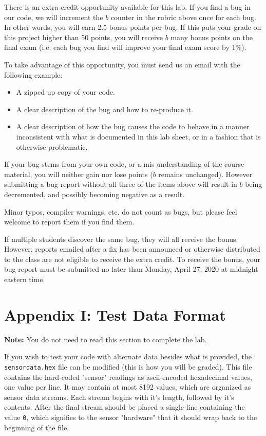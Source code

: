 \documentclass{article}
\begin{document}
There is an extra credit opportunity available for this lab. If you find a bug
in our code, we will increment the $b$ counter in the rubric above once for
each bug. In other words, you will earn 2.5 bonus points per bug. If this puts
your grade on this project higher than 50 points, you will receive $b$ many
bonus points on the final exam (i.e. each bug you find will improve your final
exam score by 1\%).

To take advantage of this opportunity, you must send us an email with the
following example:

\begin{itemize}

	\item A zipped up copy of your code.

	\item A clear description of the bug and how to re-produce it.

	\item A clear description of how the bug causes the code to behave in a
		manner inconsistent with what is documented in this lab sheet,
		or in a fashion that is otherwise problematic.

\end{itemize}

If your bug stems from your own code, or a mis-understanding of the course
material, you will neither gain nor lose points ($b$ remains unchanged).
However submitting a bug report without all three of the items above will
result in $b$ being decremented, and possibly becoming negative as a result.

Minor typos, compiler warnings, etc. do not count as bugs, but please feel
welcome to report them if you find them.

If multiple students discover the same bug, they will all receive the bonus.
However, reports emailed after a fix has been announced or otherwise
distributed to the class are not eligible to receive the extra credit. To
receive the bonus, your bug report must be submitted no later than Monday,
April 27, 2020 at midnight eastern time.

\section*{Appendix I: Test Data Format}

\textbf{Note:} You do not need to read this section to complete the lab.

If you wish to test your code with alternate data besides what is provided, the
\texttt{sensordata.hex} file can be modified (this is how you will be graded).
This file contains the hard-coded "sensor" readings as ascii-encoded
hexadecimal values, one value per line. It may contain at most 8192 values,
which are organized as sensor data streams. Each stream begins with it's
length, followed by it's contents. After the final stream should be placed a
single line containing the value \texttt{0}, which signifies to the sensor
"hardware" that it should wrap back to the beginning of the file.
\end{document}
